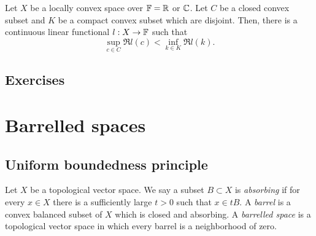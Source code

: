 \documentclass{../../large}
\begin{document}
\begin{prb}

Let $X$ be a locally convex space over $\mathbb{F}=\mathbb{R}$ or $\mathbb{C}$.
Let $C$ be a closed convex subset and $K$ be a compact convex subset which are disjoint.
Then, there is a continuous linear functional $l:X\to\mathbb{F}$ such that
\[\sup_{c\in C}\Re l(c)<\inf_{k\in K}\Re l(k).\]
\end{prb}




\section*{Exercises}
\begin{prb}
\end{prb}





\chapter{Barrelled spaces}

\section{Uniform boundedness principle}
\begin{prb}
Let $X$ be a topological vector space.
We say a subset $B\subset X$ is \emph{absorbing} if for every $x\in X$ there is a sufficiently large $t>0$ such that $x\in tB$.
A \emph{barrel} is a convex balanced subset of $X$ which is closed and absorbing.
A \emph{barrelled space} is a topological vector space in which every barrel is a neighborhood of zero.
\end{prb}

\end{document}
